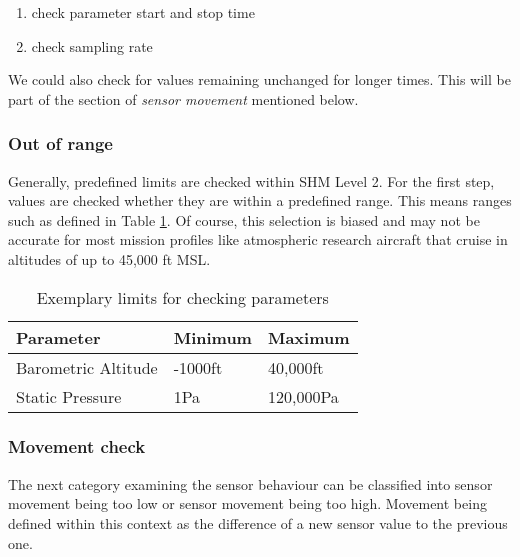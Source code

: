 \begin{enumerate}
    \item check parameter start and stop time
    \item check sampling rate
\end{enumerate}

We could also check for values remaining unchanged for longer times. This will be part of the section of \textit{sensor movement} mentioned below.

\subsubsection{Out of range}
Generally, predefined limits are checked within SHM Level 2. For the first step, values are checked whether they are within a predefined range. This means ranges such as defined in Table \ref{tab:level_2_range}. Of course, this selection is biased and may not be accurate for most mission profiles like atmospheric research aircraft that cruise in altitudes of up to 45,000 ft MSL.

\begin{table}[]
    \centering
    \begin{tabular}{@{}lll@{}}
        \toprule
        Parameter           & Minimum & Maximum   \\ \midrule
        Barometric Altitude & -1000ft & 40,000ft  \\
        Static Pressure     & 1Pa     & 120,000Pa \\ \bottomrule
    \end{tabular}
    \caption{Exemplary limits for checking parameters}
    \label{tab:level_2_range}
\end{table}

\subsubsection{Movement check}
\label{chap:4-level_2_movement}
The next category examining the sensor behaviour can be classified into sensor movement being too low or sensor movement being too high. Movement being defined within this context as the difference of a new sensor value to the previous one.


